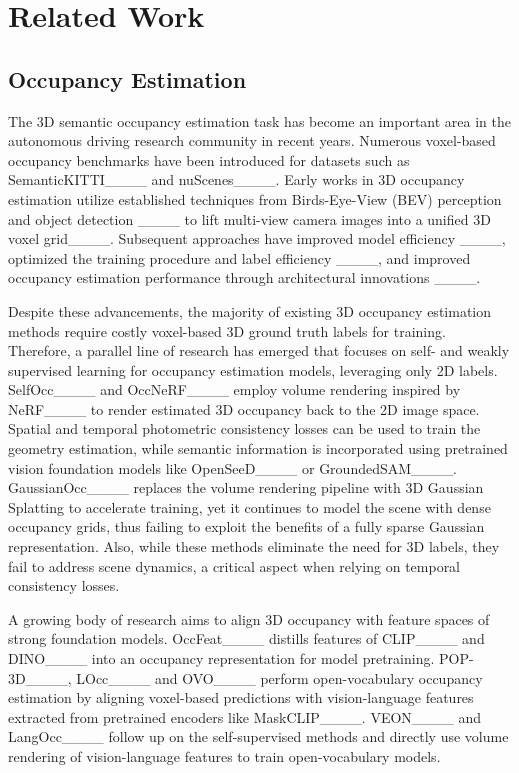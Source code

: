 \section{Related Work}
\subsection{Occupancy Estimation}
The 3D semantic occupancy estimation task has become an important area in the autonomous driving research community in recent years.
Numerous voxel-based occupancy benchmarks have been introduced for datasets such as SemanticKITTI____ and nuScenes____.
Early works in 3D occupancy estimation utilize established techniques from Birds-Eye-View (BEV) perception and object detection ____ to lift multi-view camera images into a unified 3D voxel grid____.
Subsequent approaches have improved model efficiency ____, optimized the training procedure and label efficiency ____, and improved occupancy estimation performance through architectural innovations ____.

Despite these advancements, the majority of existing 3D occupancy estimation methods require costly voxel-based 3D ground truth labels for training.
Therefore, a parallel line of research has emerged that focuses on self- and weakly supervised learning for occupancy estimation models, leveraging only 2D labels.
SelfOcc____ and OccNeRF____ employ volume rendering inspired by NeRF____ to render estimated 3D occupancy back to the 2D image space. 
Spatial and temporal photometric consistency losses can be used to train the geometry estimation, while semantic information is incorporated using pretrained vision foundation models like OpenSeeD____ or GroundedSAM____.
GaussianOcc____ replaces the volume rendering pipeline with 3D Gaussian Splatting to accelerate training, yet it continues to model the scene with dense occupancy grids, thus failing to exploit the benefits of a fully sparse Gaussian representation.
Also, while these methods eliminate the need for 3D labels, they fail to address scene dynamics, a critical aspect when relying on temporal consistency losses.

A growing body of research aims to align 3D occupancy with feature spaces of strong foundation models.
OccFeat____ distills features of CLIP____ and DINO____ into an occupancy representation for model pretraining.
POP-3D____, LOcc____ and OVO____ perform open-vocabulary occupancy estimation by aligning voxel-based predictions with vision-language features extracted from pretrained encoders like MaskCLIP____.
VEON____ and LangOcc____ follow up on the self-supervised methods and directly use volume rendering of vision-language features to train open-vocabulary models.

